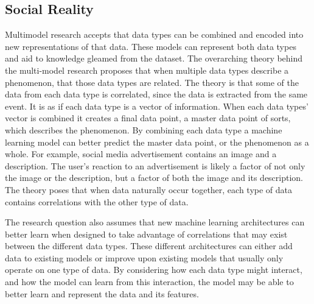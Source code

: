 \subsection{Social Reality}

Multimodel research accepts that data types can be combined and encoded into new representations of that data.  These models can represent both data types and aid to knowledge gleamed from the dataset.  The overarching theory behind the multi-model research proposes that when multiple data types describe a phenomenon, that those data types are related. The theory is that some of the data from each data type is correlated, since the data is extracted from the same event.  It is as if each data type is a vector of information.  When each data types' vector is combined it creates a final data point, a master data point of sorts, which describes the phenomenon.  By combining each data type a machine learning model can better predict the master data point, or the phenomenon as a whole.  For example, social media advertisement contains an image and a description.  The user's reaction to an advertisement is likely a factor of not only the image or the description, but a factor of both the image and its description.  The theory poses that when data naturally occur together, each type of data contains correlations with the other type of data.

The research question also assumes that new machine learning architectures can better learn when designed to take advantage of correlations that may exist between the different data types.  These different architectures can either add data to existing models or improve upon existing models that usually only operate on one type of data.  By considering how each data type might interact, and how the model can learn from this interaction, the model may be able to better learn and represent the data and its features.  
